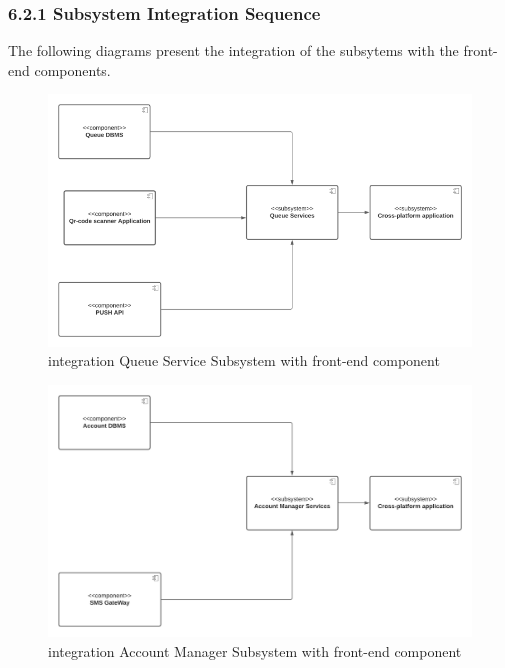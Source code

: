 \subsubsection{6.2.1 Subsystem Integration Sequence}
\label{subsect: subsytemintegrationsequence}

The following diagrams present the integration of the subsytems with the front-end components.

\begin{figure}[h!]
    \centering
    \includegraphics[width=1\textwidth]{Images/TestDiagram/view.png}
    \caption{\label{fig:viewQueue}{integration Queue Service Subsystem with front-end component}}
\end{figure}
\FloatBarrier 
\begin{figure}[h!]
    \centering
    \includegraphics[width=1\textwidth]{Images/TestDiagram/viewAccount.png}
    \caption{\label{fig:viewAccount}{integration Account Manager Subsystem with front-end component}}
\end{figure}
\FloatBarrier 
